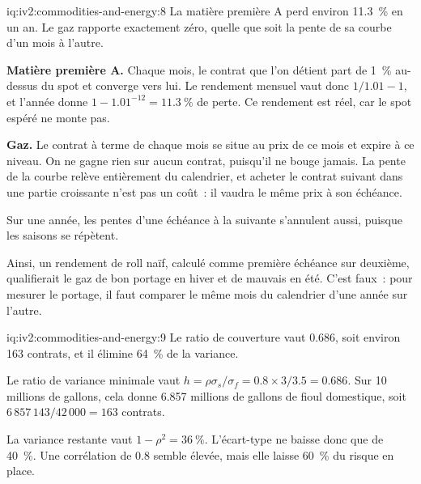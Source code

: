 \begin{solution}{iq:iv2:commodities-and-energy:8}
La matière première A perd environ 11.3~\% en un an. Le gaz rapporte exactement zéro, quelle que soit la pente de sa courbe d'un mois à l'autre.

\textbf{Matière première A.} Chaque mois, le contrat que l'on détient part de 1~\% au-dessus du spot et converge vers lui. Le rendement mensuel vaut donc $1/1.01 - 1$, et l'année donne $1 - 1.01^{-12} = 11.3~\%$ de perte. Ce rendement est réel, car le spot espéré ne monte pas.

\textbf{Gaz.} Le contrat à terme de chaque mois se situe au prix de ce mois et expire à ce niveau. On ne gagne rien sur aucun contrat, puisqu'il ne bouge jamais. La pente de la courbe relève entièrement du calendrier, et acheter le contrat suivant dans une partie croissante n'est pas un coût~: il vaudra le même prix à son échéance.

Sur une année, les pentes d'une échéance à la suivante s'annulent aussi, puisque les saisons se répètent.

Ainsi, un rendement de roll naïf, calculé comme première échéance sur deuxième, qualifierait le gaz de bon portage en hiver et de mauvais en été. C'est faux~: pour mesurer le portage, il faut comparer le même mois du calendrier d'une année sur l'autre.

\end{solution}

\begin{solution}{iq:iv2:commodities-and-energy:9}
Le ratio de couverture vaut 0.686, soit environ 163 contrats, et il élimine 64~\% de la variance.

Le ratio de variance minimale vaut $h = \rho\sigma_s/\sigma_f = 0.8 \times 3/3.5 = 0.686$. Sur 10 millions de gallons, cela donne 6.857 millions de gallons de fioul domestique, soit $6\,857\,143/42\,000 = 163$ contrats.

La variance restante vaut $1 - \rho^2 = 36~\%$. L'écart-type ne baisse donc que de 40~\%. Une corrélation de 0.8 semble élevée, mais elle laisse 60~\% du risque en place.

\end{solution}

